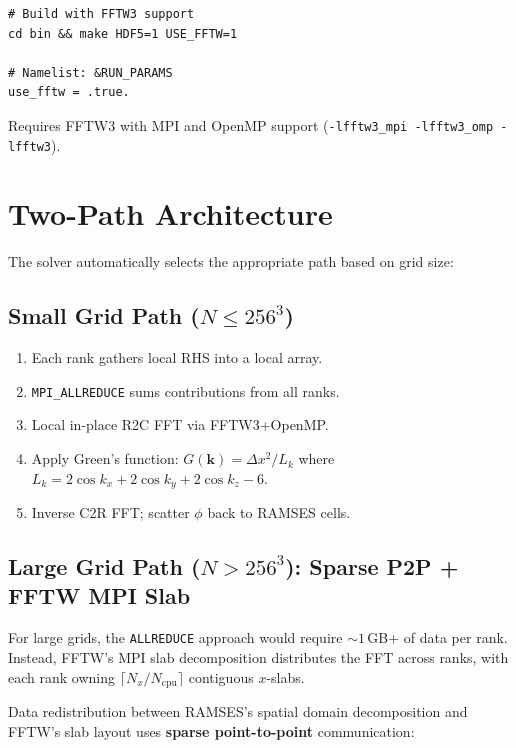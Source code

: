 \documentclass[11pt,fleqn]{book}
\begin{document}
\begin{verbatim}
# Build with FFTW3 support
cd bin && make HDF5=1 USE_FFTW=1

# Namelist: &RUN_PARAMS
use_fftw = .true.
\end{verbatim}

Requires FFTW3 with MPI and OpenMP support (\texttt{-lfftw3\_mpi -lfftw3\_omp -lfftw3}).

\section{Two-Path Architecture}

The solver automatically selects the appropriate path based on grid size:

\subsection{Small Grid Path ($N \le 256^3$)}

\begin{enumerate}[nosep]
  \item Each rank gathers local RHS into a local array.
  \item \texttt{MPI\_ALLREDUCE} sums contributions from all ranks.
  \item Local in-place R2C FFT via FFTW3+OpenMP.
  \item Apply Green's function: $G(\mathbf{k}) = \Delta x^2 / L_k$ where $L_k = 2\cos k_x + 2\cos k_y + 2\cos k_z - 6$.
  \item Inverse C2R FFT; scatter $\phi$ back to RAMSES cells.
\end{enumerate}

\subsection{Large Grid Path ($N > 256^3$): Sparse P2P + FFTW MPI Slab}

For large grids, the \texttt{ALLREDUCE} approach would require ${\sim}1$\,GB+ of data per rank.  Instead, FFTW's MPI slab decomposition distributes the FFT across ranks, with each rank owning $\lceil N_x / N_{\text{cpu}} \rceil$ contiguous $x$-slabs.

Data redistribution between RAMSES's spatial domain decomposition and FFTW's slab layout uses \textbf{sparse point-to-point} communication:
\end{document}
